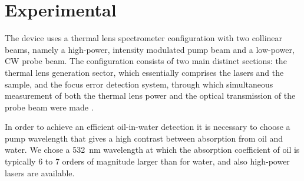 \documentclass[9pt,twocolumn,twoside]{osajnl}
\begin{document}








\section{Experimental}
\label{Experimental}

The device uses a thermal lens spectrometer configuration with two collinear beams, namely a high-power, intensity modulated pump beam and a low-power, CW probe beam. The configuration consists of two main distinct sections: the thermal lens generation sector, which essentially comprises the lasers and the sample, and the focus error detection system, through which simultaneous measurement of both the thermal lens power and the optical transmission of the probe beam were made \cite{Domene2017}.

In order to achieve an efficient oil-in-water detection it is necessary to choose a pump wavelength that gives a high contrast between absorption from oil and water. We chose a \SI{532}{\nano\metre} wavelength at which the absorption coefficient of oil is typically \SI{6}{} to \SI{7}{} orders of magnitude larger than for water, and also high-power lasers are available.
\end{document}
